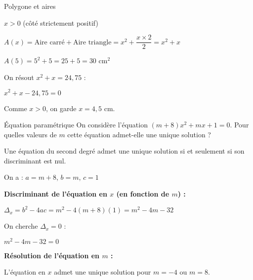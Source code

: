 \begin{EXO}{Polygone et aires}{}
\begin{tcbenumerate}[1]
\tcbitem $x > 0$ (côté strictement positif)

\tcbitem $A(x) = \text{Aire carré} + \text{Aire triangle} = x^2 + \dfrac{x \times 2}{2} = x^2 + x$

\tcbitem $A(5) = 5^2 + 5 = 25 + 5 = 30$ cm$^2$

\tcbitem On résout $x^2 + x = 24,75$ :

$x^2 + x - 24,75 = 0$


Comme $x > 0$, on garde $x = 4,5$ cm.
\end{tcbenumerate}
\end{EXO}

\vspace{-1mm}
\def\rdifficulty{2.5}
\begin{EXO}{Équation paramétrique}{}
On considère l'équation $(m+8)x^2+mx+1=0$. Pour quelles valeurs de $m$ cette équation admet-elle une unique solution ?

\exocorrection

Une équation du second degré admet une unique solution si et seulement si son discriminant est nul.

On a : $a = m+8$, $b = m$, $c = 1$

\textbf{Discriminant de l'équation en $x$ (en fonction de $m$) :}

$\Delta_x = b^2 - 4ac = m^2 - 4(m+8)(1) = m^2 - 4m - 32$

On cherche $\Delta_x = 0$ :

$m^2 - 4m - 32 = 0$

\textbf{Résolution de l'équation en $m$ :}


L'équation en $x$ admet une unique solution pour $m = -4$ ou $m = 8$.
\end{EXO}


